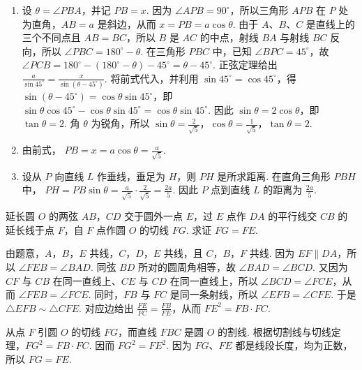 \begin{solution}
\begin{enumerate}
\item 设 \(\theta=\angle PBA\)，并记 \(PB=x\). 因为 \(\angle APB=90^\circ\)，所以三角形 \(APB\) 在 \(P\) 处为直角，\(AB=a\) 是斜边，从而 \(x=PB=a\cos\theta\).
由于 \(A\)、\(B\)、\(C\) 是直线上的三个不同点且 \(AB=BC\)，所以 \(B\) 是 \(AC\) 的中点，射线 \(BA\) 与射线 \(BC\) 反向，所以
\(\angle PBC=180^\circ-\theta\). 在三角形 \(PBC\) 中，已知 \(\angle BPC=45^\circ\)，故 \(\angle PCB=180^\circ-\left(180^\circ-\theta\right)-45^\circ=\theta-45^\circ\). 正弦定理给出 \(\frac{a}{\sin45^\circ}=\frac{x}{\sin\left(\theta-45^\circ\right)}\). 将前式代入，并利用 \(\sin45^\circ=\cos45^\circ\)，得 \(\sin\left(\theta-45^\circ\right)=\cos\theta\sin45^\circ\)，即 \(\sin\theta\cos45^\circ-\cos\theta\sin45^\circ=\cos\theta\sin45^\circ\). 因此 \(\sin\theta=2\cos\theta\)，即 \(\tan\theta=2\). 角 \(\theta\) 为锐角，所以 \(\sin\theta=\frac{2}{\sqrt5}\)，\(\cos\theta=\frac{1}{\sqrt5}\)，\(\tan\theta=2\).

\item 由前式，
\(PB=x=a\cos\theta=\frac{a}{\sqrt5}\).
\item 设从 \(P\) 向直线 \(L\) 作垂线，垂足为 \(H\)，则 \(PH\) 是所求距离. 在直角三角形 \(PBH\) 中，
\(PH=PB\sin\theta=\frac{a}{\sqrt5}\cdot\frac{2}{\sqrt5}=\frac{2a}{5}\).
因此 \(P\) 点到直线 \(L\) 的距离为 \(\frac{2a}{5}\).
\end{enumerate}
\end{solution}

\begin{problem}
延长圆 \(O\) 的两弦 \(AB\)，\(CD\) 交于圆外一点 \(E\)，过 \(E\) 点作 \(DA\) 的平行线交 \(CB\) 的延长线于点 \(F\)，自 \(F\) 点作圆 \(O\) 的切线 \(FG\). 求证 \(FG=FE\).

\end{problem}

\begin{solution}
由题意，\(A\)，\(B\)，\(E\) 共线，\(C\)，\(D\)，\(E\) 共线，且 \(C\)，\(B\)，\(F\) 共线. 因为 \(EF\parallel DA\)，所以 \(\angle FEB=\angle BAD\). 同弦 \(BD\) 所对的圆周角相等，故 \(\angle BAD=\angle BCD\). 又因为 \(CF\) 与 \(CB\) 在同一直线上、\(CE\) 与 \(CD\) 在同一直线上，所以 \(\angle BCD=\angle FCE\)，从而 \(\angle FEB=\angle FCE\). 同时，\(FB\) 与 \(FC\) 是同一条射线，所以 \(\angle EFB=\angle CFE\). 于是 \(\triangle EFB\sim\triangle CFE\). 对应边给出 \(\frac{FE}{FC}=\frac{FB}{FE}\)，从而 \(FE^2=FB\cdot FC\).

从点 \(F\) 引圆 \(O\) 的切线 \(FG\)，而直线 \(FBC\) 是圆 \(O\) 的割线. 根据切割线与切线定理，\(FG^2=FB\cdot FC\). 因而 \(FG^2=FE^2\). 因为 \(FG\)、\(FE\) 都是线段长度，均为正数，所以 \(FG=FE\).
\end{solution}
